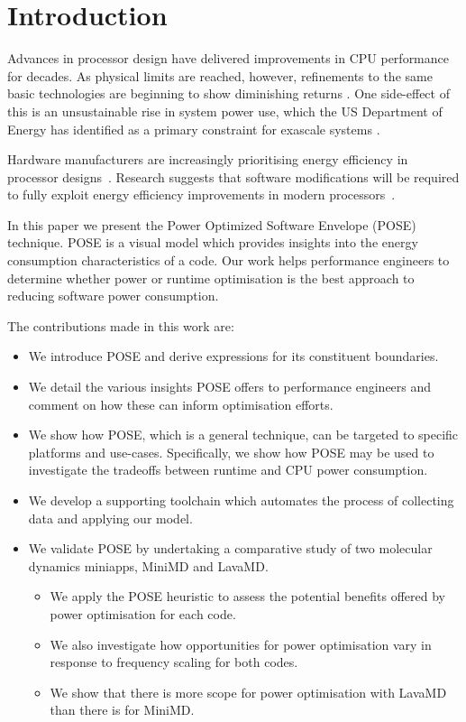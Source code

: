 \section{Introduction}
Advances in processor design have delivered improvements in CPU performance for decades. As physical limits are reached, however, refinements to the same basic technologies are beginning to show diminishing returns \cite{esmaeilzadeh:2011aa}. One side-effect of this is an unsustainable rise in system power use, which the US Department of Energy has identified as a primary constraint for exascale systems \cite{shalf:2011aa}.

Hardware manufacturers are increasingly prioritising energy efficiency in processor designs~\cite{kurd:2014aa}. 
Research suggests that software modifications will be required to fully exploit energy efficiency improvements in modern processors~\cite{shao:2013aa}. 

In this paper we present the Power Optimized Software Envelope (POSE) technique.
POSE is a visual model which provides insights into the energy consumption characteristics of a code.
Our work helps performance engineers to determine whether power or runtime optimisation is the best approach to reducing software power consumption.

\medskip \noindent
The contributions made in this work are:
\begin{itemize}
  \item We introduce POSE and derive expressions for its constituent boundaries.
  \item We detail the various insights POSE offers to performance engineers and comment on how these can inform optimisation efforts.
  \item We show how POSE, which is a general technique, can be targeted to specific platforms and use-cases. 
  Specifically, we show how POSE may be used to investigate the tradeoffs between runtime and CPU power consumption.
  \item We develop a supporting toolchain which automates the process of collecting data and applying our model. 
  \item We validate POSE by undertaking a comparative study of two molecular dynamics miniapps, MiniMD and LavaMD.
  \begin{itemize}
    \item We apply the POSE heuristic to assess the potential benefits offered by power optimisation for each code.
    \item We also investigate how opportunities for power optimisation vary in response to frequency scaling for both codes.
    \item We show that there is more scope for power optimisation with LavaMD than there is for MiniMD.
  \end{itemize}
\end{itemize}

